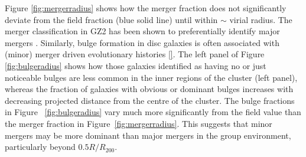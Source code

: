 \documentclass[useAMS,usenatbib]{mn2e}
\begin{document}
Figure \ref{fig:mergerradius} shows how the merger fraction does not significantly deviate from the field fraction (blue solid line) until within $\sim$ virial radius. The merger classification in GZ2 has been shown to preferentially identify major mergers \citep{}. Similarly, bulge formation in disc galaxies is often associated with (minor) merger driven evolutionary histories \ref{}. The left panel of Figure \ref{fig:bulgeradius} shows how those galaxies identified as having no or just noticeable bulges are less common in the inner regions of the cluster (left panel), whereas the fraction of galaxies with obvious or dominant bulges increases with decreasing projected distance from the centre of the cluster. The bulge fractions in Figure 
~\ref{fig:bulgeradius} vary much more significantly from the field value than the merger fraction in Figure~\ref{fig:mergerradius}. This suggests that minor mergers may be more dominant than major mergers in the group environment, particularly beyond $0.5 R/R_{200}$. 
\end{document}
